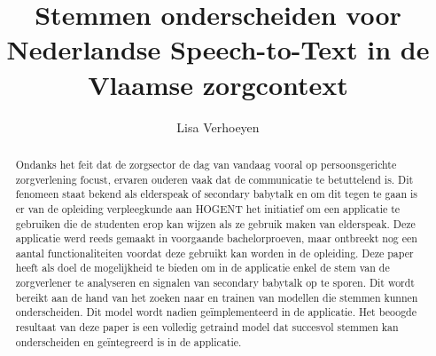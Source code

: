 \documentclass{hogent-article}
\title{Stemmen onderscheiden voor Nederlandse Speech-to-Text in de Vlaamse zorgcontext}
\author{Lisa Verhoeyen}
\begin{document}
\begin{abstract}
	Ondanks het feit dat de zorgsector de dag van vandaag vooral op persoonsgerichte zorgverlening focust, ervaren ouderen vaak dat de communicatie te betuttelend is. Dit fenomeen staat bekend als elderspeak of secondary babytalk en om dit tegen te gaan is er van de opleiding verpleegkunde aan HOGENT het initiatief om een applicatie te gebruiken die de studenten erop kan wijzen als ze gebruik maken van elderspeak. Deze applicatie werd reeds gemaakt in voorgaande bachelorproeven, maar ontbreekt nog een aantal functionaliteiten voordat deze gebruikt kan worden in de opleiding. Deze paper heeft als doel de mogelijkheid te bieden om in de applicatie enkel de stem van de zorgverlener te analyseren en signalen van secondary babytalk op te sporen. Dit wordt bereikt aan de hand van het zoeken naar en trainen van modellen die stemmen kunnen onderscheiden. Dit model wordt nadien geïmplementeerd in de applicatie. Het beoogde resultaat van deze paper is een volledig getraind model dat succesvol stemmen kan onderscheiden en geïntegreerd is in de applicatie.
\end{abstract}

\tableofcontents



\printbibliography[heading=bibintoc]
\end{document}
